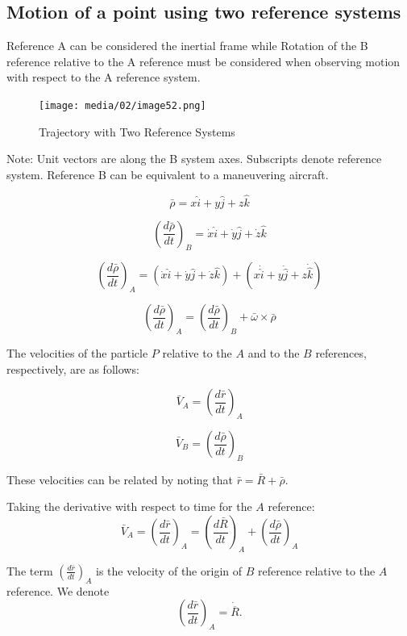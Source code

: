 \documentclass[
]{book}
\begin{document}
\hypertarget{motion-of-a-point-using-two-reference-systems}{%
\subsection{Motion of a point using two reference systems}\label{motion-of-a-point-using-two-reference-systems}}

Reference A can be considered the inertial frame while Rotation of the B reference relative to the A reference must be considered when observing motion with respect to the A reference system.

\begin{figure}
\centering
\texttt{[image: media/02/image52.png]}
\caption{Trajectory with Two Reference Systems}
\end{figure}

Note: Unit vectors are along the B system axes. Subscripts denote reference system. Reference B can be equivalent to a maneuvering aircraft.

\[\bar{\rho} = x \hat{i} + y \hat{j} + z \hat{k}\]

\[\left( \frac{d \bar{\rho}}{dt} \right)_B = \dot{x} \hat{i} + \dot{y} \hat{j} + \dot{z} \hat{k}\]

\[\left( \frac{d \bar{\rho}}{dt} \right)_A = \left( \dot{x}\hat{i} + \dot{y}\hat{j} + \dot{z}\hat{k} \right) + \left( x \dot{\hat{i}} + y \dot{\hat{j}} + z \dot{\hat{k}} \right)\]

\[\left( \frac{d \bar{\rho}}{dt} \right)_A = \left( \frac{d \bar{\rho}}{dt} \right)_B + \bar{\omega} \times \bar{\rho}\]

The velocities of the particle \(P\) relative to the \(A\) and to the \(B\) references, respectively, are as follows:

\[\bar{V}_A = \left( \frac{d\bar{r}}{dt} \right)_A\]

\[\bar{V}_B = \left( \frac{d\bar{\rho}}{dt} \right)_B\]

These velocities can be related by noting that \(\bar{r} = \bar{R} + \bar{\rho}\).

Taking the derivative with respect to time for the \(A\) reference:
\[\bar{V}_A = \left(\frac{d \bar{r}}{dt}  \right)_A = \left( \frac{d \bar{R}}{dt} \right)_A + \left( \frac{d \bar{\rho}}{dt} \right)_A\]

The term \(\left(\frac{d \bar{r}}{dt} \right)_A\) is the velocity of the origin of \(B\) reference relative to the \(A\) reference. We denote
\[\left(\frac{d \bar{r}}{dt}  \right)_A = \dot{\overline{R}}.\]
\end{document}
